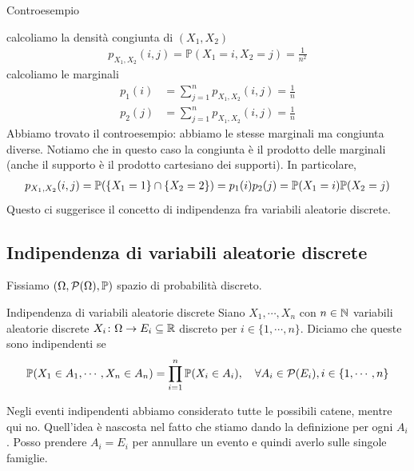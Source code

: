 \documentclass[a4paper]{article}
\begin{document}
\begin{snippetexample}{Controesempio}
\begin{enumerate}
            calcoliamo la densità congiunta di \((X_1, X_2)\)
            \begin{align*}
                p_{X_1, X_2}(i, j) = \mathbb P(X_1 = i, X_2 = j) = \frac{1}{n^2}
            \end{align*}
            calcoliamo le marginali
            \begin{align*}
                p_1(i) &= \sum_{j=1}^n p_{X_1, X_2}(i,j)
                = \frac{1}{n} \\
                p_2(j) &= \sum_{j=1}^n p_{X_1, X_2}(i,j)
                = \frac{1}{n}
            \end{align*}
            Abbiamo trovato il controesempio: abbiamo le stesse marginali ma congiunta diverse.
            Notiamo che in questo caso la congiunta è il prodotto delle marginali (anche il supporto
            è il prodotto cartesiano dei supporti). In particolare,
            \begin{align*}
                p_{X_1, X_2}(i,j) = \mathbb P(\{X_1 = 1\} \cap \{X_2 = 2\})
                = p_1(i)p_2(j) = \mathbb P(X_1 = i) \mathbb P(X_2 = j)
            \end{align*}
            Questo ci suggerisce il concetto di indipendenza fra variabili aleatorie discrete.
    \end{enumerate}
\end{snippetexample}

\subsection{Indipendenza di variabili aleatorie discrete}

Fissiamo \((\Omega, \mathcal P(\Omega), \mathbb P)\)
spazio di probabilità discreto.

\begin{snippetdefinition}{Indipendenza di variabili aleatorie discrete}
    Siano \(X_1, \cdots, X_n\) con \(n \in \mathbb{N}\)
    variabili aleatorie discrete \(X_i \colon \Omega \to E_i \subseteq \mathbb{R}\)
    discreto per \(i \in \{1, \cdots, n\}\). Diciamo che queste sono indipendenti se
    \[
        \mathbb P(X_1 \in A_1, \cdots, X_n \in A_n)
        = \prod_{i=1}^n \mathbb P(X_i \in A_i), \quad
        \forall A_i \in \mathcal P(E_i), i \in \{1, \cdots, n\}
    \]
\end{snippetdefinition}

Negli eventi indipendenti abbiamo considerato tutte le possibili catene, mentre qui no.
Quell'idea è nascosta nel fatto che stiamo dando la definizione per ogni \(A_i\).
Posso prendere \(A_i = E_i\) per annullare un evento e quindi averlo sulle singole famiglie.
\end{document}
